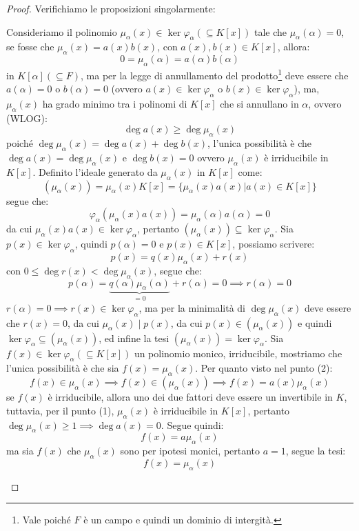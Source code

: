 \documentclass[11pt]{scrartcl}
\begin{document}
\begin{proof}
Verifichiamo le proposizioni singolarmente:
	\begin{enumerate}[(1)]
	\ii Consideriamo il polinomio $\mu_\alpha (x) \in \ker \varphi_\alpha (\subseteq K[x])$ tale che $\mu_\alpha (\alpha) = 0$, se fosse che $\mu_\alpha (x) = a(x)b(x)$, con $a(x),b(x) \in K[x]$, allora:
		\[ 0 = \mu_\alpha (\alpha) = a(\alpha)b(\alpha)
		\]
in $K[\alpha] (\subseteq F)$, ma per la legge di annullamento del prodotto\footnote{Vale poiché $F$ è un campo e quindi un dominio di intergità.} deve essere che $a(\alpha) = 0$ o $b(\alpha) = 0$ (ovvero $a(x)  \in \ker \varphi_\alpha$ o $b(x)  \in \ker \varphi_\alpha$), ma, $\mu_\alpha (x)$ ha grado minimo tra i polinomi di $K[x]$ che si annullano in $\alpha$, ovvero (WLOG):
		\[ \deg a(x) \geq \deg \mu_\alpha(x)
		\]
		poiché $ \deg \mu_\alpha(x) =  \deg a(x) +  \deg b(x)$, l'unica possibilità è che $\deg a(x) = \deg \mu_\alpha(x)$ e $\deg b(x) = 0$ ovvero $\mu_\alpha (x)$ è irriducibile in $K[x]$.
	\ii Definito l'ideale generato da $\mu_\alpha (x)$ in $K[x]$ come:
		\[ (\mu_\alpha (x)) = \mu_\alpha (x)K[x] = \{\mu_\alpha (x)a(x) | a(x) \in K[x]\}
		\]
		segue che:
			\[ \varphi_\alpha(\mu_\alpha (x)a(x)) = \mu_\alpha (\alpha)a(\alpha) = 0
			\]
		da cui $\mu_\alpha (x)a(x) \in \ker \varphi_\alpha$, pertanto $(\mu_\alpha (x)) \subseteq \ker \varphi_\alpha$. Sia $p(x) \in \ker \varphi_\alpha$, quindi $p(\alpha) = 0$ e $p(x) \in K[x]$, possiamo scrivere:
		\[ p(x)=q(x)\mu_\alpha (x) + r(x)
		\]
		con $0\leq \deg r(x) < \deg \mu_\alpha (x)$, segue che:
		\[ p(\alpha) = \underbrace{q(\alpha)\mu_\alpha (\alpha)}_{=0} + r(\alpha) = 0 \implies r(\alpha) = 0
		\]
		$r(\alpha) = 0 \implies r(x) \in \ker \varphi_\alpha$, ma per la minimalità di $\deg \mu_\alpha (x)$ deve essere che $r(x) = 0$, da cui $\mu_\alpha (x) \mid p(x)$, da cui $p(x) \in (\mu_\alpha (x))$ e 
		quindi $\ker\varphi_\alpha \subseteq (\mu_\alpha (x))$, ed infine la tesi $(\mu_\alpha (x)) = \ker\varphi_\alpha$.
	\ii Sia $f(x) \in \ker\varphi_\alpha (\subseteq K[x])$ un polinomio monico, irriducibile, mostriamo che l'unica possibilità è che sia $f(x) = \mu_\alpha (x)$. Per quanto visto nel punto (2):
		\[ f(x) \in \mu_\alpha (x) \implies f(x) \in (\mu_\alpha (x)) \implies f(x) = a(x)\mu_\alpha (x)
		\]
		se $f(x)$ è irriducibile, allora uno dei due fattori deve essere un invertibile in $K$, tuttavia, per il punto (1), $\mu_\alpha (x)$ è irriducibile in $K[x]$, pertanto $\deg \mu_\alpha (x) \geq 1 \implies \deg a(x) = 0$. Segue quindi:
			\[ f(x) = a\mu_\alpha (x)
			\]
			ma sia $f(x)$ che $\mu_\alpha (x)$ sono per ipotesi monici, pertanto $a = 1$, segue la tesi:
			\[ f(x) = \mu_\alpha (x)
			\]
	\end{enumerate}
\end{proof}
 
\end{document}
